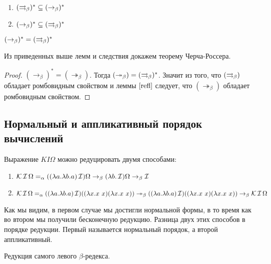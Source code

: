 \begin{lemma}
	\
	\begin{enumerate}
		\item $(\rightrightarrows_{\beta} )^{*} \subseteq (\to_{\beta})^{*}$
		\item $(\to_{\beta})^{*} \subseteq (\rightrightarrows_{\beta} )^{*}$
	\end{enumerate}
\end{lemma}

\begin{cons}
	$(\to_{\beta})^{*}=(\rightrightarrows_{\beta} )^{*}$
\end{cons}

Из приведенных выше лемм и следствия докажем теорему Черча-Россера.

\begin{proof}
	$(\to_{\beta})^{*} = (\twoheadrightarrow_{\beta})$. Тогда $(\twoheadrightarrow_{\beta})=(\rightrightarrows_{\beta} )^{*}$. Значит из того, что $(\rightrightarrows_{\beta} )$ обладает ромбовидным свойством и леммы $\ref{refl}$ следует, что $(\twoheadrightarrow_{\beta})$ обладает ромбовидным свойством.
\end{proof}

\subsection{Нормальный и аппликативный порядок вычислений}

\begin{example}
	Выражение $KI\Omega$ можно редуцировать двумя способами:
	\begin{enumerate}
		\item $\operatorname{\mathcal{K}} \operatorname{\mathcal{I}} \Omega =_{\alpha} ((\lambda{}a.\lambda{}b.a) \operatorname{\mathcal{I}}) \Omega \to_{\beta} (\lambda{}b.\operatorname{\mathcal{I}})\Omega  \to_{\beta} \operatorname{\mathcal{I}}$
		\item  $\comb K \comb I \Omega =_{\alpha} ((\lambda{}a.\lambda{}b.a) \comb I)((\lambda{}x.x \ x) (\lambda{}x.x \ x)) \twoheadrightarrow_{\beta} ((\lambda{}a.\lambda{}b.a) \comb I)((\lambda{}x.x \ x) (\lambda{}x.x \ x)) \to_{\beta} \comb K \comb I \Omega $
	\end{enumerate}
	
\end{example}

Как мы видим, в первом случае мы достигли нормальной формы, в то время как во втором мы получили бесконечную редукцию. Разница двух этих способов в порядке редукции. Первый называется нормальный порядок, а второй аппликативный. 

\begin{definition}
	Редукция самого левого $\beta$-редекса.
\end{definition}

